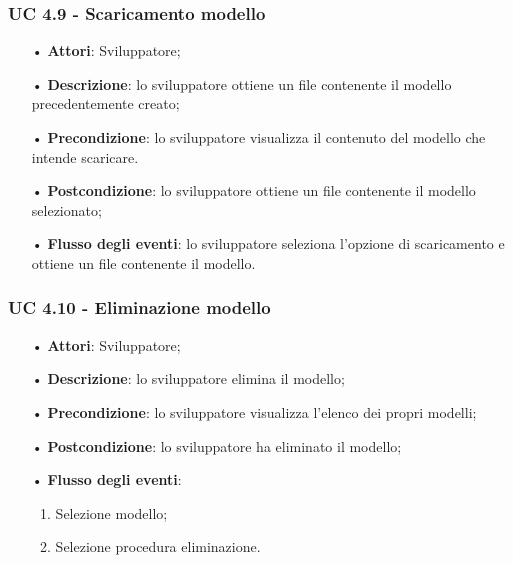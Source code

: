 \subsubsection{UC 4.9 - Scaricamento modello}
\begin{itemize}
	\item[•]\textbf{Attori}: Sviluppatore;
	\item[•]\textbf{Descrizione}: lo sviluppatore ottiene un file contenente il modello precedentemente creato;
	\item[•]\textbf{Precondizione}: lo sviluppatore visualizza il contenuto del modello che intende scaricare.
	\item[•]\textbf{Postcondizione}: lo sviluppatore ottiene un file contenente il modello selezionato;
	\item[•]\textbf{Flusso degli eventi}: lo sviluppatore seleziona l'opzione di scaricamento e ottiene un file contenente il modello.
\end{itemize}

\subsubsection{UC 4.10 - Eliminazione modello}
\begin{itemize}
	\item[•]\textbf{Attori}: Sviluppatore;
	\item[•]\textbf{Descrizione}: lo sviluppatore elimina il modello;
	\item[•]\textbf{Precondizione}: lo sviluppatore visualizza l'elenco dei propri modelli;
	\item[•]\textbf{Postcondizione}: lo sviluppatore ha eliminato il modello; 
	\item[•]\textbf{Flusso degli eventi}: 
	\begin{enumerate}
		\item Selezione modello;
		\item Selezione procedura eliminazione.
	\end{enumerate}   
\end{itemize}



